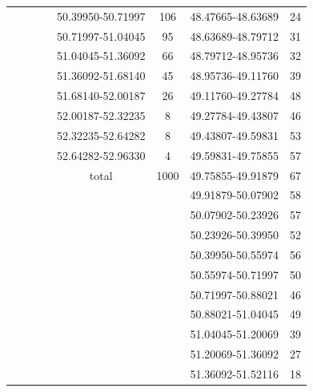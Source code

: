 \begin{table}[p]
\begin{center}
\begin{tabular}{cccccccc}
                                        & & & & 50.39950-50.71997 & 106 & 48.47665-48.63689 & 24 \\
                                        & & & & 50.71997-51.04045 &  95 & 48.63689-48.79712 & 31 \\
                                        & & & & 51.04045-51.36092 &  66 & 48.79712-48.95736 & 32 \\
                                        & & & & 51.36092-51.68140 &  45 & 48.95736-49.11760 & 39 \\
                                        & & & & 51.68140-52.00187 &  26 & 49.11760-49.27784 & 48 \\
                                        & & & & 52.00187-52.32235 &   8 & 49.27784-49.43807 & 46 \\
                                        & & & & 52.32235-52.64282 &   8 & 49.43807-49.59831 & 53 \\
                                        & & & & 52.64282-52.96330 &   4 & 49.59831-49.75855 & 57 \\
                                                              & & & & total & 1000 & 49.75855-49.91879 & 67 \\
                                                              & & & & & & 49.91879-50.07902 & 58 \\
                                                              & & & & & & 50.07902-50.23926 & 57 \\
                                                              & & & & & & 50.23926-50.39950 & 52 \\
                                                              & & & & & & 50.39950-50.55974 & 56 \\
                                                              & & & & & & 50.55974-50.71997 & 50 \\
                                                              & & & & & & 50.71997-50.88021 & 46 \\
                                                              & & & & & & 50.88021-51.04045 & 49 \\
                                                              & & & & & & 51.04045-51.20069 & 39 \\
                                                              & & & & & & 51.20069-51.36092 & 27 \\
                                                              & & & & & & 51.36092-51.52116 & 18 \\

\end{tabular}
\end{center}
\end{table}

